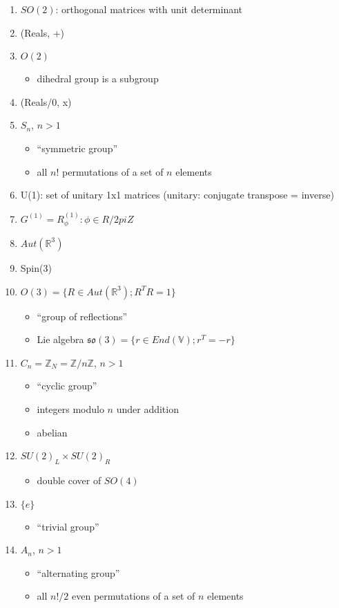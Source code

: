 \documentclass[11pt]{article}
\newcommand{\R}{\mathbb{R}}
\begin{document}
\begin{enumerate}
    \item $SO(2)$: orthogonal matrices with unit determinant
    \item (Reals, +) 
    \item $O(2)$ 
    \begin{itemize}
        \item dihedral group is a subgroup 
    \end{itemize}
	\item (Reals/{0}, x) 
	\item $S_n$, $n>1$
        \begin{itemize}
            \item ``symmetric group''
            \item all $n!$ permutations of a set of $n$ elements
        \end{itemize}
	\item U(1): set of unitary 1x1 matrices (unitary: conjugate transpose = inverse)
    \item $G^(1) = {R_\phi^(1): \phi \in R/2piZ}$  
	\item $Aut(\R^3)$
	\item Spin(3)
    \item $O(3) = \{ R \in Aut(\R^3); R^TR = 1\}$
        \begin{itemize}
            \item ``group of reflections''
            \item Lie algebra $\mathfrak{so}(3) =\{ r \in End(\mathbb{V}); r^T = -r \}$ 
        \end{itemize}
    \item $C_n = \mathbb{Z}_N = \mathbb{Z}/n\mathbb{Z}$, $n>1$ 
        \begin{itemize}
            \item ``cyclic group''
            \item integers modulo $n$ under addition
            \item abelian
        \end{itemize}
    \item $SU(2)_L \times SU(2)_R$
        \begin{itemize}
            \item double cover of $SO(4)$
        \end{itemize}
    \item $\{ e\}$ 
        \begin{itemize}
            \item ``trivial group''
        \end{itemize}
    \item $A_n$, $n>1$
        \begin{itemize}
            \item ``alternating group''
            \item all $n!/2$ even permutations of a set of $n$ elements
        \end{itemize}
\end{enumerate}
\end{document}
